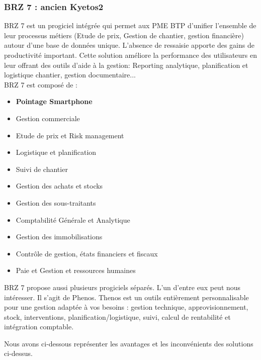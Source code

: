 		\subsubsection{BRZ 7 : ancien Kyetos2}
		
		BRZ 7 est un progiciel intégrée qui permet aux PME BTP d'unifier l'ensemble de leur processus métiers (Etude de prix, Gestion de chantier, gestion financière) autour d'une base de données unique. 
    L'absence de ressaisie apporte des gains de productivité important. 
    Cette solution améliore la performance des utilisateurs en leur offrant des outils d'aide à la gestion: Reporting analytique, 
    planification et logistique chantier, gestion documentaire...\\ 
		BRZ 7 est composé de :
 		
     \begin{itemize}
		  \item \textbf{Pointage Smartphone}
		  \item Gestion commerciale
		  \item Etude de prix et Risk management
		  \item Logistique et planification
		  \item Suivi de chantier
		  \item Gestion des achats et stocks
		  \item Gestion des sous-traitants
		  \item Comptabilité Générale et Analytique
		  \item Gestion des immobilisations
		  \item Contrôle de gestion, états financiers et fiscaux
		  \item Paie et Gestion et ressources humaines\\
		\end{itemize}
		
		BRZ 7 propose aussi plusieurs progiciels séparés. L'un d'entre eux peut nous intéresser. Il s'agit de Phenos.
    Thenos est un outils entièrement personnalisable pour une gestion adaptée à vos besoins : 
    gestion technique, approvisionnement, stock, interventions, planification/logistique, suivi, calcul de rentabilité et intégration comptable. 
		  
		


Nous avons ci-dessous représenter les avantages et les inconvénients des solutions ci-dessus.


